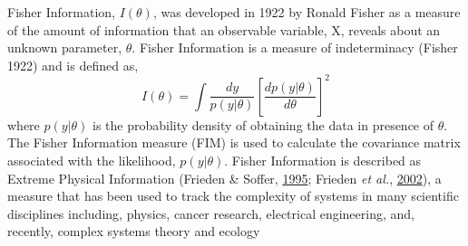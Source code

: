 \documentclass[12pt,twoside,openany]{reedthesis}
\begin{document}
Fisher Information, \(I(\theta)\), was developed in 1922 by Ronald Fisher as a measure of the amount of information that an observable variable, X, reveals about an unknown parameter, \(\theta\). Fisher Information is a measure of indeterminacy (Fisher 1922) and is defined as,
\begin{equation} 
  I(\theta) = \int \frac{dy}{p(y|\theta)}\left[\frac{dp(y|\theta)}{d\theta}\right]^2
  \label{eq:fiGeneral1922}
\end{equation}
where \(p(y|\theta)\) is the probability density of obtaining the data in presence of \(\theta\). The Fisher Information measure (FIM) is used to calculate the covariance matrix associated with the likelihood, \(p(y|\theta)\). Fisher Information is described as Extreme Physical Information (Frieden \& Soffer, \protect\hyperlink{ref-frieden1995lagrangians}{1995}; Frieden \emph{et al.}, \protect\hyperlink{ref-frieden_non-equilibrium_2002}{2002}), a measure that has been used to track the complexity of systems in many scientific disciplines including, physics, cancer research, electrical engineering, and, recently, complex systems theory and ecology
\end{document}
